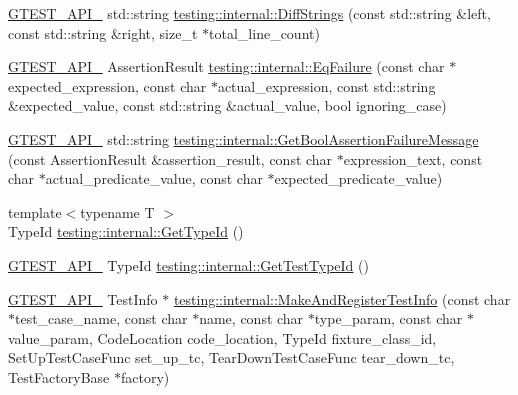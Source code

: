 \begin{DoxyCompactItemize}
\item 
\mbox{\hyperlink{gtest-port_8h_aa73be6f0ba4a7456180a94904ce17790}{G\+T\+E\+S\+T\+\_\+\+A\+P\+I\+\_\+}} std\+::string \mbox{\hyperlink{namespacetesting_1_1internal_a513107ff8defa97d949937fc1350a56c}{testing\+::internal\+::\+Diff\+Strings}} (const std\+::string \&left, const std\+::string \&right, size\+\_\+t $\ast$total\+\_\+line\+\_\+count)
\item 
\mbox{\hyperlink{gtest-port_8h_aa73be6f0ba4a7456180a94904ce17790}{G\+T\+E\+S\+T\+\_\+\+A\+P\+I\+\_\+}} Assertion\+Result \mbox{\hyperlink{namespacetesting_1_1internal_a08725846ff184d3e79bcf5be4df19157}{testing\+::internal\+::\+Eq\+Failure}} (const char $\ast$expected\+\_\+expression, const char $\ast$actual\+\_\+expression, const std\+::string \&expected\+\_\+value, const std\+::string \&actual\+\_\+value, bool ignoring\+\_\+case)
\item 
\mbox{\hyperlink{gtest-port_8h_aa73be6f0ba4a7456180a94904ce17790}{G\+T\+E\+S\+T\+\_\+\+A\+P\+I\+\_\+}} std\+::string \mbox{\hyperlink{namespacetesting_1_1internal_a5fd6e5dc9eb20ab3c3a80e24d89dfac6}{testing\+::internal\+::\+Get\+Bool\+Assertion\+Failure\+Message}} (const Assertion\+Result \&assertion\+\_\+result, const char $\ast$expression\+\_\+text, const char $\ast$actual\+\_\+predicate\+\_\+value, const char $\ast$expected\+\_\+predicate\+\_\+value)
\item 
{\footnotesize template$<$typename T $>$ }\\Type\+Id \mbox{\hyperlink{namespacetesting_1_1internal_a6b108e56fdc68ea937ffb3759fb55ab0}{testing\+::internal\+::\+Get\+Type\+Id}} ()
\item 
\mbox{\hyperlink{gtest-port_8h_aa73be6f0ba4a7456180a94904ce17790}{G\+T\+E\+S\+T\+\_\+\+A\+P\+I\+\_\+}} Type\+Id \mbox{\hyperlink{namespacetesting_1_1internal_ad0d66d56ead224263cd100c1d6bfc562}{testing\+::internal\+::\+Get\+Test\+Type\+Id}} ()
\item 
\mbox{\hyperlink{gtest-port_8h_aa73be6f0ba4a7456180a94904ce17790}{G\+T\+E\+S\+T\+\_\+\+A\+P\+I\+\_\+}} Test\+Info $\ast$ \mbox{\hyperlink{namespacetesting_1_1internal_a7f2e4e46c969fcae9d801d93a3e932fd}{testing\+::internal\+::\+Make\+And\+Register\+Test\+Info}} (const char $\ast$test\+\_\+case\+\_\+name, const char $\ast$name, const char $\ast$type\+\_\+param, const char $\ast$value\+\_\+param, Code\+Location code\+\_\+location, Type\+Id fixture\+\_\+class\+\_\+id, Set\+Up\+Test\+Case\+Func set\+\_\+up\+\_\+tc, Tear\+Down\+Test\+Case\+Func tear\+\_\+down\+\_\+tc, Test\+Factory\+Base $\ast$factory)
\item 

\end{DoxyCompactItemize}
